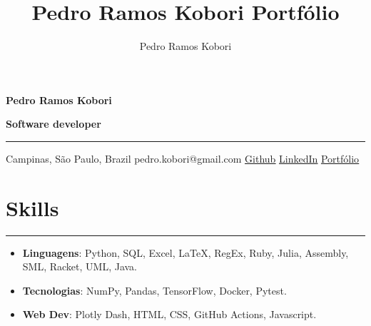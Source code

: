 \documentclass[a4paper,10pt]{article}
\title{Pedro Ramos Kobori Portfólio}
\newcommand{\ulink}[2]{\href{#1}{\underline{#2}}}
\begin{document}
\date{}
\author{Pedro Ramos Kobori}

\noindent
\begin{minipage}[t]{0.5\textwidth}
  \begin{flushleft}
    \textbf{\Large Pedro Ramos Kobori}
  \end{flushleft}
\end{minipage}
\begin{minipage}[t]{0.5\textwidth}
  \begin{flushright}
    \textbf{\Large Software developer}
  \end{flushright}
\end{minipage}

\hrule

\vspace{2mm}
\noindent
{
  \centering
  Campinas, São Paulo, Brazil \textbar{}
  pedro.kobori@gmail.com \textbar{}
  \ulink{https://github.com/rokobo}{Github} \textbar{}
  \ulink{https://www.linkedin.com/in/pedrokobori/}{LinkedIn} \textbar{}
  \ulink{https://rokobo.github.io}{Portfólio}
  \par
}

\section*{Skills}
\hrule
\vspace{2mm}
\begin{itemize}[itemsep=0pt]
  \item \textbf{Linguagens}: Python, SQL, Excel, LaTeX, RegEx, Ruby, Julia, Assembly, SML, Racket, UML, Java.
  \item \textbf{Tecnologias}: NumPy, Pandas, TensorFlow, Docker, Pytest.
  \item \textbf{Web Dev}: Plotly Dash, HTML, CSS, GitHub Actions, Javascript.
\end{itemize}
\end{document}
